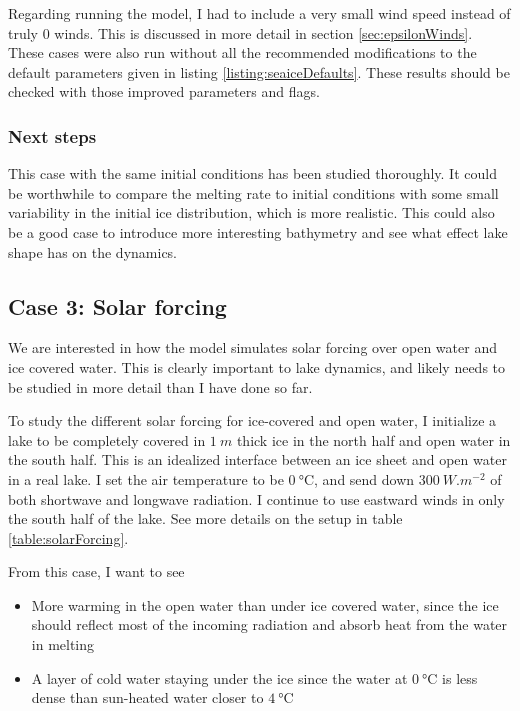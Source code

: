 \documentclass[11pt]{article}
\begin{document}
Regarding running the model, I had to include a very small wind speed instead of truly 0 winds. This is discussed in more detail in section \ref{sec:epsilonWinds}. These cases were also run without all the recommended modifications to the default parameters given in listing \ref{listing:seaiceDefaults}. These results should be checked with those improved parameters and flags.

\subsubsection{Next steps}
This case with the same initial conditions has been studied thoroughly. It could be worthwhile to compare the melting rate to initial conditions with some small variability in the initial ice distribution, which is more realistic. This could also be a good case to introduce more interesting bathymetry and see what effect lake shape has on the dynamics.

\subsection{Case 3: Solar forcing}
We are interested in how the model simulates solar forcing over open water and ice covered water. This is clearly important to lake dynamics, and likely needs to be studied in more detail than I have done so far.

To study the different solar forcing for ice-covered and open water, I initialize a lake to be completely covered in $\SI{1}{m}$ thick ice in the north half and open water in the south half. This is an idealized interface between an ice sheet and open water in a real lake. I set the air temperature to be $\SI{0}{\celsius}$, and send down $\SI{300}{W.m^{-2}}$ of both shortwave and longwave radiation. I continue to use eastward winds in only the south half of the lake. See more details on the setup in table \ref{table:solarForcing}.

From this case, I want to see
\begin{itemize}
\item{More warming in the open water than under ice covered water, since the ice should reflect most of the incoming radiation and absorb heat from the water in melting}
\item{A layer of cold water staying under the ice since the water at $\SI{0}{\celsius}$ is less dense than sun-heated water closer to $\SI{4}{\celsius}$}
\end{itemize}
\end{document}
